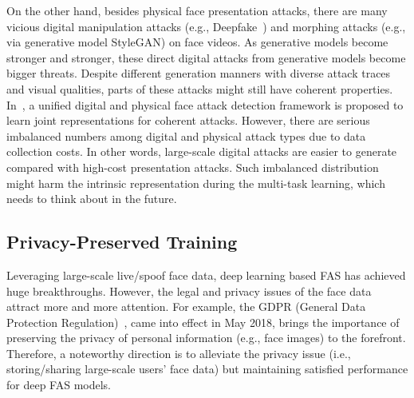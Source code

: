 \documentclass[10pt,journal,compsoc]{IEEEtran}
\begin{document}
On the other hand, besides physical face presentation attacks, there are many vicious digital manipulation attacks (e.g., Deepfake~\cite{ciftci2020fakecatcher}) and morphing attacks (e.g., via generative model StyleGAN\cite{sarkar2022gan}) on face videos. As generative models become stronger and stronger, these direct digital attacks from generative models become bigger threats. Despite different generation manners with diverse attack traces and visual qualities, parts of these attacks might still have coherent properties. In~\cite{deb2021unified,yu2022benchmarking}, a unified digital and physical face attack detection framework is proposed to learn joint representations for coherent attacks. However, there are serious imbalanced numbers among digital and physical attack types due to data collection costs. In other words, large-scale digital attacks are easier to generate compared with high-cost presentation attacks. Such imbalanced distribution might harm the intrinsic representation during the multi-task learning, which needs to think about in the future. 



\vspace{-0.5em}
\subsection{ Privacy-Preserved Training}

Leveraging large-scale live/spoof face data, deep learning based FAS has achieved huge breakthroughs. However, the legal and privacy issues of the face data attract more and more attention. For example, the GDPR (General Data Protection Regulation)~\cite{voigt2017eu}, came into effect in May 2018, brings the importance of preserving the privacy of personal information (e.g., face images) to the forefront. Therefore, a noteworthy direction is to alleviate the privacy issue (i.e., storing/sharing large-scale users' face data) but maintaining satisfied performance for deep FAS models. 
\end{document}
